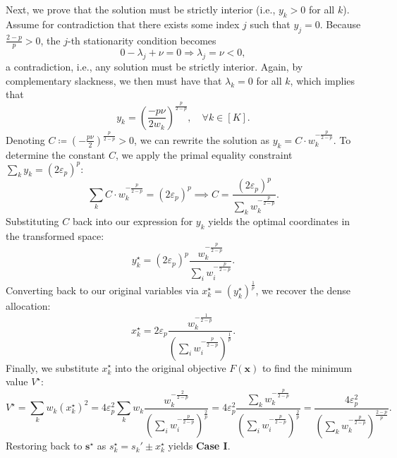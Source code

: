 \documentclass{article}
\def\vs{{\bm{s}}}
\def\vx{{\bm{x}}}
\theoremstyle{plain}
\theoremstyle{definition}
\theoremstyle{plain}
\begin{document}
Next, we prove that the solution must be strictly interior (i.e., $y_k > 0$ for all $k$).
Assume for contradiction that there exists some index $j$ such that $y_j = 0$.
Because $\frac{2-p}{p} > 0$, the $j$-th stationarity condition becomes
\begin{equation}
    0 - \lambda_j + \nu = 0 \Longrightarrow \lambda_j = \nu < 0,
\end{equation}
a contradiction, i.e., any solution must be strictly interior.
Again, by complementary slackness, we then must have that $\lambda_k = 0$ for all $k$, which implies that
\begin{equation}
    y_k = \left( \frac{-p \nu}{2 w_k} \right)^{\frac{p}{2-p}}, \quad \forall k \in [K].
\end{equation}
Denoting $C \coloneq (- \frac{p \nu}{2})^{\frac{p}{2-p}} > 0$, we can rewrite the solution as $y_k = C \cdot w_k^{-\frac{p}{2-p}}$.
To determine the constant $C$, we apply the primal equality constraint $\sum_k y_k = (2\varepsilon_p)^p$:
\begin{equation}
    \sum_k C \cdot w_k^{-\frac{p}{2-p}} = (2\varepsilon_p)^p \implies C = \frac{(2\varepsilon_p)^p}{\sum_k w_k^{-\frac{p}{2-p}}}.
\end{equation}
Substituting $C$ back into our expression for $y_k$ yields the optimal coordinates in the transformed space:
\begin{equation}
    y_k^\star = (2\varepsilon_p)^p \frac{w_k^{-\frac{p}{2-p}}}{\sum_i w_i^{-\frac{p}{2-p}}}.
\end{equation}
Converting back to our original variables via $x_k^\star = (y_k^\star)^{\frac{1}{p}}$, we recover the dense allocation:
\begin{equation}
    x_k^\star = 2\varepsilon_p \frac{w_k^{-\frac{1}{2-p}}}{\left( \sum_i w_i^{-\frac{p}{2-p}} \right)^{\frac{1}{p}}}.
\end{equation}
Finally, we substitute $x_k^\star$ into the original objective $F(\vx)$ to find the minimum value $V^\star$:
\begin{equation}
    V^\star = \sum_k w_k (x_k^\star)^2 
    = 4 \varepsilon_p^2 \sum_k w_k \frac{w_k^{-\frac{2}{2-p}}}{\left( \sum_i w_i^{-\frac{p}{2-p}} \right)^{\frac{2}{p}}} 
    = 4 \varepsilon_p^2 \frac{\sum_k w_k^{-\frac{p}{2-p}}}{\left( \sum_i w_i^{-\frac{p}{2-p}} \right)^{\frac{2}{p}}}
    = \frac{4 \varepsilon_p^2}{\left( \sum_k w_k^{-\frac{p}{2-p}} \right)^{\frac{2-p}{p}}}.
\end{equation}
Restoring back to $\vs^\star$ as $s^\star_k = s_k' \pm x_k^\star$ yields \textbf{Case I}.
\end{document}
